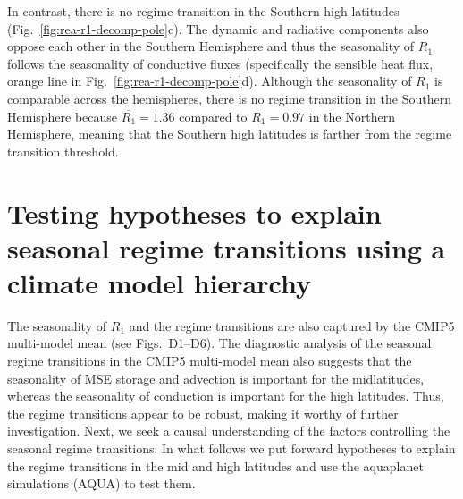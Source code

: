 \documentclass{ametsocV5}
\begin{document}
    In contrast, there is no regime transition in the Southern high latitudes (Fig.~\ref{fig:rea-r1-decomp-pole}c). The dynamic and radiative components also oppose each other in the Southern Hemisphere and thus the seasonality of $R_1$ follows the seasonality of conductive fluxes (specifically the sensible heat flux, orange line in Fig.~\ref{fig:rea-r1-decomp-pole}d). Although the seasonality of $R_1$ is comparable across the hemispheres, there is no regime transition in the Southern Hemisphere because $\overline{R_1}=1.36$ compared to $R_1=0.97$ in the Northern Hemisphere, meaning that the Southern high latitudes is farther from the regime transition threshold.


\section{Testing hypotheses to explain seasonal regime transitions using a climate model hierarchy} \label{sec:hypo}

  
  The seasonality of $R_1$ and the regime transitions are also captured by the CMIP5 multi-model mean (see Figs.~D1--D6). The diagnostic analysis of the seasonal regime transitions in the CMIP5 multi-model mean also suggests that the seasonality of MSE storage and advection is important for the midlatitudes, whereas the seasonality of conduction is important for the high latitudes. Thus, the regime transitions appear to be robust, making it worthy of further investigation. Next, we seek a causal understanding of the factors controlling the seasonal regime transitions. In what follows we put forward hypotheses to explain the regime transitions in the mid and high latitudes and use the aquaplanet simulations (AQUA) to test them. 
  
\end{document}
